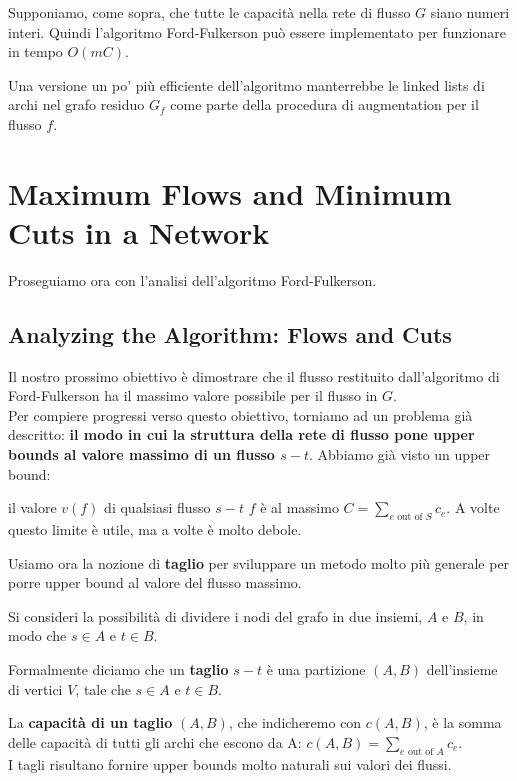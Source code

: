 \begin{myblockquote}
  Supponiamo, come sopra, che tutte le capacità nella rete di flusso $G$
  siano numeri interi. Quindi l'algoritmo Ford-Fulkerson può essere
  implementato per funzionare in tempo $O(mC)$.
\end{myblockquote}

Una versione un po' più efficiente dell'algoritmo manterrebbe le linked
lists di archi nel grafo residuo $G_f$ come parte della procedura di
augmentation per il flusso $f$.


\section{Maximum Flows and Minimum Cuts in a Network}

Proseguiamo ora con l'analisi dell'algoritmo Ford-Fulkerson.


\subsection{Analyzing the Algorithm: Flows and Cuts}

Il nostro prossimo obiettivo è dimostrare che il flusso restituito
dall'algoritmo di Ford-Fulkerson ha il massimo valore possibile per il
flusso in $G$.\\

Per compiere progressi verso questo obiettivo, torniamo ad un problema
già descritto: \textbf{il modo in cui la struttura della rete di flusso
  pone upper bounds al valore massimo di un flusso $s-t$}. Abbiamo già
visto un upper bound:

\begin{myblockquote}
  il valore $v(f)$ di qualsiasi
  flusso $s-t$ $f$ è al massimo
  $C = \sum_{e \text{ out of } S} c_e$. A volte questo limite è utile,
  ma a volte è molto debole.
\end{myblockquote}

Usiamo ora la nozione di \textbf{taglio} per sviluppare un metodo molto
più generale per porre upper bound al valore del flusso massimo.

\begin{myblockquote}
  Si consideri la possibilità di dividere i nodi del grafo
  in due insiemi, $A$ e $B$, in modo che $s \in A$ e $t \in B$.

  Formalmente diciamo che un \textbf{taglio} $s-t$ è una
  partizione $(A, B)$ dell'insieme di vertici $V$, tale che
  $s \in A$ e $t \in B$.

  La \textbf{capacità di un taglio} $(A, B)$, che indicheremo con $c(A , B)$, è la somma delle
  capacità di tutti gli archi che escono da A:
  $
    c(A, B) = \sum_{e \text{ out of } A} c_e.
  $\\
  I tagli risultano fornire upper bounds molto naturali sui valori dei flussi.
\end{myblockquote}

